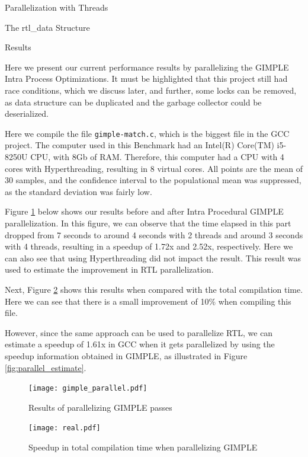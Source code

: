 \begin{section}{Parallelization with Threads}
\begin{subsection}{The rtl\_data Structure}
\end{subsection}

\begin{subsection}{Results}

Here we present our current performance results by parallelizing the GIMPLE
Intra Process Optimizations. It must be highlighted that this project still had
race conditions, which we discuss later, and further, some locks can be
removed, as data structure can be duplicated and the garbage collector could be
deserialized.

Here we compile the file \texttt{gimple-match.c}, which is the biggest file in
the GCC project. The computer used in this Benchmark had an Intel(R) Core(TM)
i5-8250U CPU, with 8Gb of RAM.  Therefore, this computer had a CPU with 4 cores
with Hyperthreading, resulting in 8 virtual cores. All points are the mean of
30 samples, and the confidence interval to the populational mean was
suppressed, as the standard deviation was fairly low. 

Figure \ref{fig:parallel_gimple} below shows our results before and after Intra
Procedural GIMPLE parallelization. In this figure, we can observe that the time
elapsed in this part dropped from 7 seconds to around 4 seconds with 2 threads
and around 3 seconds with 4 threads, resulting in a speedup of 1.72x and 2.52x,
respectively. Here we can also see that using Hyperthreading did not impact the
result. This result was used to estimate the improvement in RTL
parallelization.

Next, Figure \ref{fig:parallel_real} shows this results when compared with the
total compilation time. Here we can see that there is a small improvement of
10\% when compiling this file.

However, since the same approach can be used to parallelize RTL, we can
estimate a speedup of 1.61x in GCC when it gets parallelized by using the
speedup information obtained in GIMPLE, as illustrated in Figure
\ref{fig:parallel_estimate}.

\begin{figure}[ht]
 \centering
 \texttt{[image: gimple\_parallel.pdf]}
 \caption{Results of parallelizing GIMPLE passes}
 \label{fig:parallel_gimple}
\end{figure}

\begin{figure}[ht]
 \centering
 \texttt{[image: real.pdf]}
 \caption{Speedup in total compilation time when parallelizing GIMPLE}
 \label{fig:parallel_real}
\end{figure}


\end{subsection}
\end{section}
